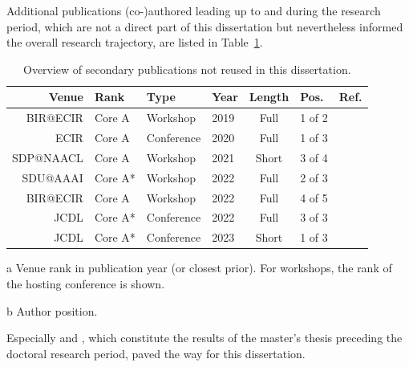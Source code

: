 Additional publications (co-)authored leading up to and during the research period, which are not a direct part of this dissertation but nevertheless informed the overall research trajectory, are listed in Table~\ref{tab:secondarypublicationoverview}.

\begin{table}[h]
  \caption[Overview of secondary publications not reused in this dissertation]{Overview of secondary publications not reused in this dissertation.}
  \label{tab:secondarypublicationoverview}
  \centering
  \begin{threeparttable}
  \begin{tabular}{rlllclr}
    \hline
    Venue & Rank\tnote{a} & Type      & Year & Length & Pos.\tnote{b} & Ref. \\
    \hline
    BIR@ECIR  & Core A  & Workshop    & 2019 & Full   & 1 of 2 & \cite{Saier2019} \\
    ECIR      & Core A  & Conference  & 2020 & Full   & 1 of 3 & \cite{Saier2020a} \\
    SDP@NAACL & Core A  & Workshop    & 2021 & Short  & 3 of 4 & \cite{Krause2021} \\
    SDU@AAAI  & Core A* & Workshop    & 2022 & Full   & 2 of 3 & \cite{Shapiro2022} \\
    BIR@ECIR  & Core A  & Workshop    & 2022 & Full   & 4 of 5 & \cite{Faerber2022bir} \\
    JCDL      & Core A* & Conference  & 2022 & Full   & 3 of 3 & \cite{Nishioka2022} \\
    JCDL      & Core A* & Conference  & 2023 & Short  & 1 of 3 & \cite{Saier2023cocon} \\
    \hline
    \end{tabular}
    \begin{tablenotes}
      \item[a] Venue rank in publication year (or closest prior). For workshops, the rank of the hosting conference is shown.
      \item[b] Author position.
    \end{tablenotes}
    \end{threeparttable}
\end{table}

Especially \cite{Saier2019} and \cite{Saier2020a}, which constitute the results of the master's thesis preceding the doctoral research period, paved the way for this dissertation.
